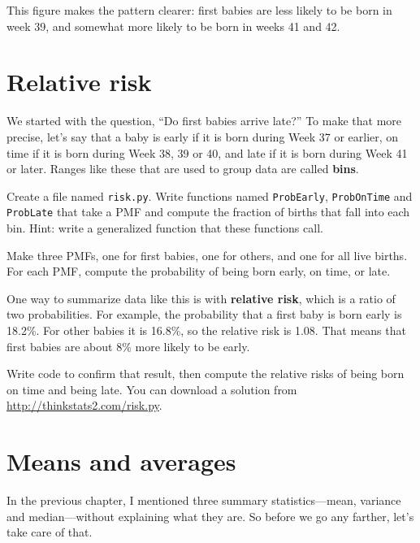 \documentclass[12pt]{book}
\begin{document}
This figure makes the pattern clearer: first babies are
less likely to be born in week 39, and somewhat more likely
to be born in weeks 41 and 42.


\section{Relative risk}
\label{relative.risk}

We started with the question, ``Do first babies arrive late?''  To
make that more precise, let's say that a baby is early if it is born
during Week 37 or earlier, on time if it is born during Week 38, 39 or
40, and late if it is born during Week 41 or later.  Ranges like these
that are used to group data are called {\bf bins}.

\begin{exercise}
Create a file named {\tt risk.py}.
Write functions named {\tt ProbEarly}, {\tt ProbOnTime} and
{\tt ProbLate} that take a PMF and compute the fraction of births
that fall into each bin.  Hint: write a generalized function
that these functions call.

Make three PMFs, one for first babies, one for others, and one for
all live births.  For each PMF, compute the probability of being
born early, on time, or late.

One way to summarize data like this is with {\bf relative risk},
which is a ratio of two probabilities.  For example, the probability
that a first baby is born early is 18.2\%.  For other babies it is
16.8\%, so the relative risk is 1.08.  That means that first babies
are about 8\% more likely to be early.

Write code to confirm that result, then compute the relative risks of
being born on time and being late.  You can download a solution
from \url{http://thinkstats2.com/risk.py}.

\end{exercise}


\section{Means and averages}
\label{mean}

In the previous chapter, I mentioned three summary statistics---mean,
variance and median---without explaining what they are.  So before
we go any farther, let's take care of that.
\end{document}
